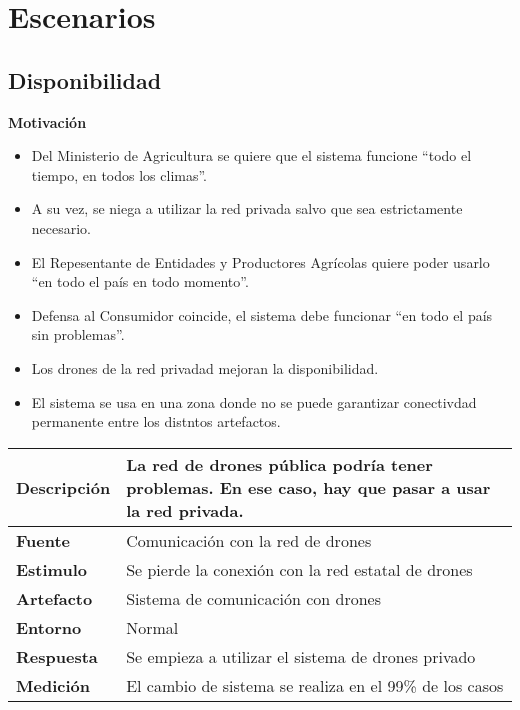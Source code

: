 \section{Escenarios}
\subsection{Disponibilidad}
\textbf{Motivación}
\begin{itemize}
 \item Del Ministerio de Agricultura se quiere que el sistema funcione ``todo el tiempo, en todos los climas''.
 \item A su vez, se niega a utilizar la red privada salvo que sea estrictamente necesario.
 \item El Repesentante de Entidades y Productores Agrícolas quiere poder usarlo ``en todo el país en todo momento''.
 \item Defensa al Consumidor coincide, el sistema debe funcionar ``en todo el país sin problemas''.
 \item Los drones de la red privadad mejoran la disponibilidad.
 \item El sistema se usa en una zona donde no se puede garantizar conectivdad permanente entre los distntos artefactos.
\end{itemize}


\begin{tabular}{| l || p{12cm} |}
\hline 
\textbf{Descripci\'on} & La red de drones pública podría tener problemas. En ese caso, hay que pasar a usar la red privada. \\
\hline 
\textbf{Fuente} & Comunicación con la red de drones \\
\hline 
\textbf{Estimulo} & Se pierde la conexi\'on con la red estatal de drones \\
\hline 
\textbf{Artefacto} & Sistema de comunicación con drones \\
\hline 
\textbf{Entorno} & Normal \\
\hline 
\textbf{Respuesta} & Se empieza a utilizar el sistema de drones privado \\
\hline 
\textbf{Medici\'on} & El cambio de sistema se realiza en el 99\% de los casos \\
\hline 
\end{tabular}

\medskip

